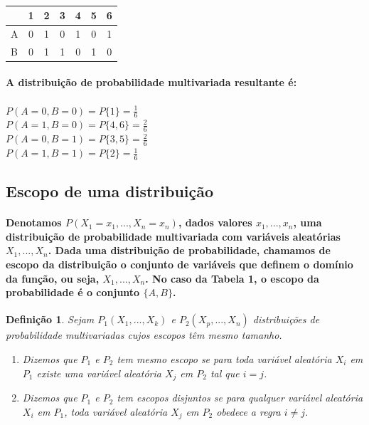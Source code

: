 \documentclass[a4paper,10pt]{article}
\theoremstyle{plain}
\newtheorem*{spn-def}{Definição}
\begin{document}
\begin{table}[h]
\caption{}
\begin{tabular}{l | *{6}{c}}
  & 1 & 2 & 3 & 4 & 5 & 6 \\
\hline
A & 0 & 1 & 0 & 1 & 0 & 1 \\
B & 0 & 1 & 1 & 0 & 1 & 0 \\
\end{tabular}
\end{table}

\paragraph{
  A distribuição de probabilidade multivariada resultante é:
}

\subparagraph{$P(A=0,B=0) = P\{1\} = \frac{1}{6}$ \\
  $P(A=1,B=0) = P\{4,6\} = \frac{2}{6}$ \\
  $P(A=0,B=1) = P\{3,5\} = \frac{2}{6}$ \\
  $P(A=1,B=1) = P\{2\} = \frac{1}{6}$
} 

\subsection{Escopo de uma distribuição}

\paragraph{
  Denotamos $P(X_1=x_1,...,X_n=x_n)$, dados valores $x_1,...,x_n$, uma distribuição de probabilidade multivariada
com variáveis aleatórias $X_1,...,X_n$. Dada uma distribuição de probabilidade, chamamos de escopo da distribuição 
o conjunto de variáveis que definem o domínio da função, ou seja, $X_1,...,X_n$. No caso da Tabela 1, o escopo da 
probabilidade é o conjunto $\{A, B\}$. 
}

\begin{spn-def} Sejam $P_1 (X_1,...,X_k)$ e $P_2 (X_p,...,X_n)$ distribuições de probabilidade multivariadas cujos
  escopos têm mesmo tamanho.
\begin{enumerate} \itemsep0pt
  \item Dizemos que $P_1$ e $P_2$ tem mesmo escopo se para toda variável aleatória $X_i$ em $P_1$ existe uma
variável aleatória $X_j$ em $P_2$ tal que $i=j$.
  \item Dizemos que $P_1$ e $P_2$ tem escopos disjuntos se para qualquer variável aleatória $X_i$ em $P_1$,
toda variável aleatória $X_j$ em $P_2$ obedece a regra $i\neq{j}$. 
\end{enumerate}
\end{spn-def}
\end{document}
